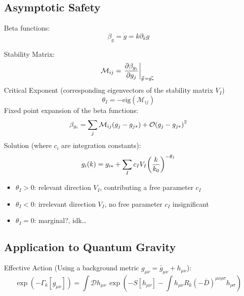 	\subsection{Asymptotic Safety}
		Beta functions:
		\begin{equation}
			\beta_g = \dot{g} = k \partial_k g
		\end{equation}

		\noindent
		Stability Matrix:
		\begin{equation}
			\mathcal{M}_{ij} = \eval{\pdv{\beta_{g_i}}{g_j}}_{\vec{g} = \vec{g_*}}
		\end{equation}
		Critical Exponent (corresponding eigenvectors of the stability matrix $V_I$)
		\begin{equation}
			\theta_I = - \mathrm{eig}(\mathcal{M}_{ij})
		\end{equation}
		Fixed point expansion of the beta functions:
		\begin{equation}
			\beta_{g_i} = \sum_{j} \mathcal{M}_{ij} \qty(g_j - g_{j*}) + \mathcal{O}\qty(g_j - g_{j*})^2
		\end{equation}
		Solution (where $c_i$ are integration constants):
		\begin{equation}
			g_i(k) = g_{i*} + \sum_I c_I V_I \qty(\frac{k}{k_0})^{-\theta_I}
		\end{equation}
		\begin{itemize}
			\item $\theta_I > 0$: relevant direction $V_I$, contributing a free parameter $c_I$
			\item $\theta_I < 0$: irrelevant direction $V_I$, no free parameter $c_I$ insignificant
			\item $\theta_I = 0$: marginal?, idk\dots
		\end{itemize}

	\subsection{Application to Quantum Gravity}
		Effective Action (Using a background metric $g_{\mu\nu} = \bar{g}_{\mu\nu} + h_{\mu\nu}$):
		\begin{equation}
			\exp(-\Gamma_k[g_{\mu\nu}]) = \int \mathcal{D}h_{\mu\nu} \, \exp(-S[h_{\mu\nu}] - \int h_{\mu\nu} R_k(-\bar{D})^{\mu\nu\rho\sigma}h_{\rho\sigma})
		\end{equation}

